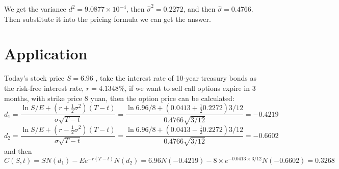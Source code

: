 \documentclass{article}
\begin{document}
We get the variance $d^2 = 9.0877\times 10^{-4}$, then $\hat{\sigma}^2 = 0.2272$, and then $\hat{\sigma} = 0.4766$. Then substitute it into the pricing formula we can get the answer.

\section{Application}
Today's stock price $S = 6.96$ , take the interest rate of 10-year treasury bonds as the risk-free interest rate, $r = 4.1348\%$, if we want to sell call options expire in 3 months, with strike price 8 yuan, then the option price can be calculated:
\[
    d_1 = \frac{\ln{S/E}+(r+\frac{1}{2} \sigma^2)(T-t)}{\sigma \sqrt{T-t}} = \frac{\ln{6.96/8}+(0.0413+\frac{1}{2} 0.2272)3/12}{0.4766 \sqrt{3/12}}=-0.4219
\]
\[
    d_2 = \frac{\ln{S/E}+(r-\frac{1}{2} \sigma^2)(T-t)}{\sigma \sqrt{T-t}} = \frac{\ln{6.96/8}+(0.0413-\frac{1}{2} 0.2272)3/12}{0.4766 \sqrt{3/12}}= -0.6602
\]
and then
\[
    C(S,t) = SN(d_1)-Ee^{-r(T-t)}N(d_2) = 6.96N(-0.4219)-8\times e^{-0.0413\times 3/12} N(-0.6602) = 0.3268
\]
\end{document}
